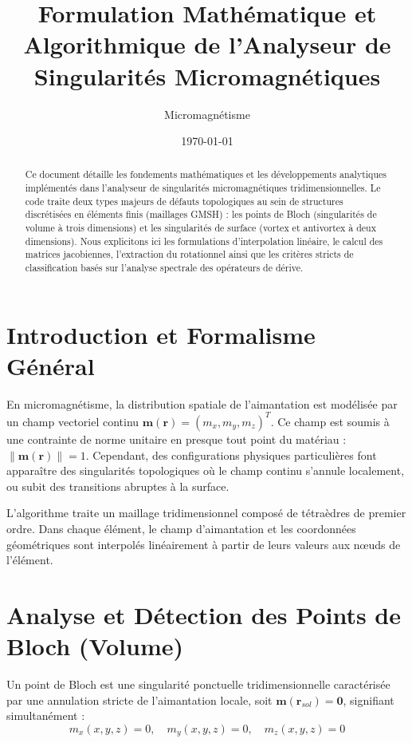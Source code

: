 \documentclass[11pt,a4paper]{article}
\title{Formulation Mathématique et Algorithmique de l'Analyseur de Singularités Micromagnétiques}
\author{Micromagnétisme}
\date{\today}
\begin{document}
\maketitle

\begin{abstract}
Ce document détaille les fondements mathématiques et les développements analytiques implémentés dans l'analyseur de singularités micromagnétiques tridimensionnelles. Le code traite deux types majeurs de défauts topologiques au sein de structures discrétisées en éléments finis (maillages GMSH) : les points de Bloch (singularités de volume à trois dimensions) et les singularités de surface (vortex et antivortex à deux dimensions). Nous explicitons ici les formulations d'interpolation linéaire, le calcul des matrices jacobiennes, l'extraction du rotationnel ainsi que les critères stricts de classification basés sur l'analyse spectrale des opérateurs de dérive.
\end{abstract}

\section{Introduction et Formalisme Général}
En micromagnétisme, la distribution spatiale de l'aimantation est modélisée par un champ vectoriel continu $\mathbf{m}(\mathbf{r}) = (m_x, m_y, m_z)^T$. Ce champ est soumis à une contrainte de norme unitaire en presque tout point du matériau : $\|\mathbf{m}(\mathbf{r})\| = 1$. Cependant, des configurations physiques particulières font apparaître des singularités topologiques où le champ continu s'annule localement, ou subit des transitions abruptes à la surface.

L'algorithme traite un maillage tridimensionnel composé de tétraèdres de premier ordre. Dans chaque élément, le champ d'aimantation et les coordonnées géométriques sont interpolés linéairement à partir de leurs valeurs aux nœuds de l'élément.

\section{Analyse et Détection des Points de Bloch (Volume)}
Un point de Bloch est une singularité ponctuelle tridimensionnelle caractérisée par une annulation stricte de l'aimantation locale, soit $\mathbf{m}(\mathbf{r}_{sol}) = \mathbf{0}$, signifiant simultanément :
\begin{equation}
m_x(x,y,z) = 0, \quad m_y(x,y,z) = 0, \quad m_z(x,y,z) = 0
\end{equation}
\end{document}
